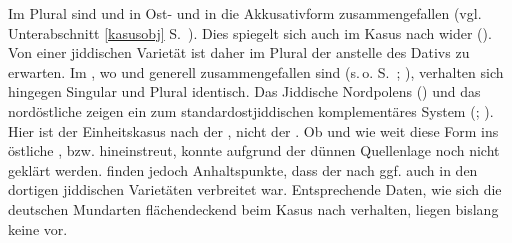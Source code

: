  
  
   Im Plural sind  und  in Ost- und  in die Akkusativform zusammengefallen (vgl.\, Unterabschnitt \ref{kasusobj} S.\, \pageref{kasusobj}). Dies spiegelt sich auch im Kasus nach  wider (\citealt{FleischerSchaefer2012}). Von einer jiddischen Varietät ist daher im Plural der  anstelle des Dativs zu erwarten. 
   Im \hai{{\NOJ}}, wo  und  generell zusammengefallen sind (s.\,o. S.\, \pageref{FNKASUSDIALEKT}; \citealt[160]{Zaretski1929}), verhalten sich hingegen Singular und Plural identisch. Das Jiddische Nordpolens (\citealt{Herzog1965}) und das nordöstliche  zeigen ein zum standardostjiddischen komplementäres System (\citealt{FleischerSchaefer2012}; \citealt[130–132]{Herzog1965}). Hier  ist der Einheitskasus nach  der , nicht der . Ob und wie weit diese Form ins östliche \hai{{\ZWJ}}, \hai{{\SWJ}} bzw.  hineinstreut, konnte aufgrund der dünnen Quellenlage noch nicht geklärt werden. \cite{FleischerSchaefer2012} finden jedoch Anhaltspunkte, dass der  nach  ggf. auch in den dortigen jiddischen Varietäten verbreitet war. Entsprechende Daten, wie sich die deutschen Mundarten flächendeckend beim Kasus nach  verhalten, liegen bislang keine vor. 
 
